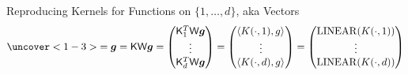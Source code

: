 \documentclass[10pt,compress,xcolor={usenames,dvipsnames},aspectratio=169]{beamer}
\DeclareMathOperator{\LIN}{LINEAR}
\begin{document}
\begin{frame}[label = RKRd]{Reproducing Kernels for Functions on $\{1, \ldots, d\}$, aka Vectors}
{{\[\uncover<1-3>{= \vg = \mK \mW \vg 
= \begin{pmatrix} \mK_1^T \mW \vg \\ \vdots \\ \mK_d^T \mW \vg\end{pmatrix}
= \begin{pmatrix} \ip{K(\cdot,1)}{g} \\ \vdots \\ \ip{K(\cdot,d)}{g} \end{pmatrix}}
= \begin{pmatrix} \LIN(K(\cdot,1)) \\ \vdots \\  \LIN(K(\cdot,d)) \end{pmatrix}
\]
}
}


\end{frame}
\end{document}
